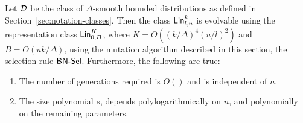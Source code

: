 \begin{theorem} Let ${\mathcal D}$ be the class of $\Delta$-smooth bounded
distributions as defined in Section~\ref{sec:notation-classes}. Then the class
$\mathsf{Lin}^k_{l, u}$ is evolvable using the representation class $\mathsf{Lin}^K_{0, B}$,
where $K = O((k/\Delta)^4 (u/l)^2)$ and $B = O(uk/\Delta)$, using the mutation
algorithm described in this section, the selection rule $\mathsf{BN\mbox{-}Sel}$.
Furthermore, the following are true:
\begin{enumerate}
\item The number of generations required is $O()$ and is independent of $n$.
\item The size polynomial $s$, depends polylogarithmically on $n$, and
polynomially on the remaining parameters.
\end{enumerate}
\label{thm:sparse_linear} \end{theorem}
